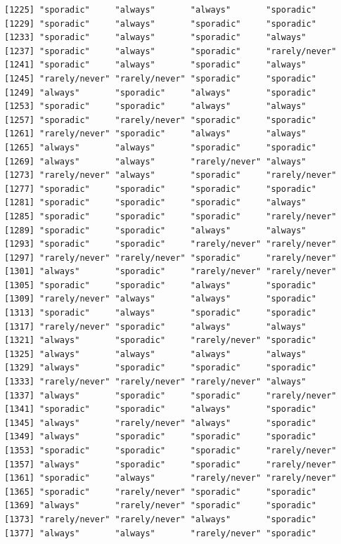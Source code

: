 \documentclass[
  letterpaper,
  DIV=11,
  numbers=noendperiod]{scrartcl}
\begin{document}
\begin{verbatim}
[1225] "sporadic"     "always"       "always"       "sporadic"    
[1229] "sporadic"     "always"       "sporadic"     "sporadic"    
[1233] "sporadic"     "always"       "sporadic"     "always"      
[1237] "sporadic"     "always"       "sporadic"     "rarely/never"
[1241] "sporadic"     "always"       "sporadic"     "always"      
[1245] "rarely/never" "rarely/never" "sporadic"     "sporadic"    
[1249] "always"       "sporadic"     "always"       "sporadic"    
[1253] "sporadic"     "sporadic"     "always"       "always"      
[1257] "sporadic"     "rarely/never" "sporadic"     "sporadic"    
[1261] "rarely/never" "sporadic"     "always"       "always"      
[1265] "always"       "always"       "sporadic"     "sporadic"    
[1269] "always"       "always"       "rarely/never" "always"      
[1273] "rarely/never" "always"       "sporadic"     "rarely/never"
[1277] "sporadic"     "sporadic"     "sporadic"     "sporadic"    
[1281] "sporadic"     "sporadic"     "sporadic"     "always"      
[1285] "sporadic"     "sporadic"     "sporadic"     "rarely/never"
[1289] "sporadic"     "sporadic"     "always"       "always"      
[1293] "sporadic"     "sporadic"     "rarely/never" "rarely/never"
[1297] "rarely/never" "rarely/never" "sporadic"     "rarely/never"
[1301] "always"       "sporadic"     "rarely/never" "rarely/never"
[1305] "sporadic"     "sporadic"     "always"       "sporadic"    
[1309] "rarely/never" "always"       "always"       "sporadic"    
[1313] "sporadic"     "always"       "sporadic"     "sporadic"    
[1317] "rarely/never" "sporadic"     "always"       "always"      
[1321] "always"       "sporadic"     "rarely/never" "sporadic"    
[1325] "always"       "always"       "always"       "always"      
[1329] "always"       "sporadic"     "sporadic"     "sporadic"    
[1333] "rarely/never" "rarely/never" "rarely/never" "always"      
[1337] "always"       "sporadic"     "sporadic"     "rarely/never"
[1341] "sporadic"     "sporadic"     "always"       "sporadic"    
[1345] "always"       "rarely/never" "always"       "sporadic"    
[1349] "always"       "sporadic"     "sporadic"     "sporadic"    
[1353] "sporadic"     "sporadic"     "sporadic"     "rarely/never"
[1357] "always"       "sporadic"     "sporadic"     "rarely/never"
[1361] "sporadic"     "always"       "rarely/never" "rarely/never"
[1365] "sporadic"     "rarely/never" "sporadic"     "sporadic"    
[1369] "always"       "rarely/never" "sporadic"     "sporadic"    
[1373] "rarely/never" "rarely/never" "always"       "sporadic"    
[1377] "always"       "always"       "rarely/never" "sporadic"    

\end{verbatim}
\end{document}
